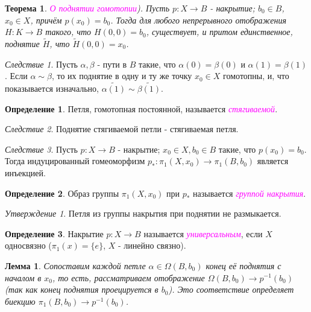 \documentclass[a4paper,100pt]{article}
\theoremstyle{indented}
\newtheorem{theorem}{Теорема}
\newtheorem{lemma}{Лемма}
\theoremstyle{definition}
\newtheorem{defn}{Определение}
\theoremstyle{remark}
\newtheorem{cons}{Следствие}
\newtheorem{stat}{Утверждение}
\DeclareMathOperator{\ra}{\rightarrow}
\begin{document}
\begin{theorem}
    \textit{\textcolor{magenta}{\hypertarget{s122}{О поднятии гомотопии}}}). Пусть $p: X \ra B$ - накрытие; $b_0 \in B$, $x_0 \in X$, причём $p(x_0)=b_0$. Тогда для любого непрерывного отображения $H: K \ra B$ такого, что $H(0, 0) = b_0$, существует, и притом единственное, поднятие $\tilde{H}$, что $\tilde{H}(0, 0) = x_0$. 
\end{theorem}

\begin{cons}
    Пусть $\alpha, \beta$ - пути в $B$ такие, что $\alpha(0) = \beta(0)$ и $\alpha(1) = \beta(1)$. Если $\alpha \sim \beta$, то их поднятие в одну и ту же точку $x_0 \in X$ гомотопны, и, что показывается изначально, $\tilde{\alpha(1)} \sim \tilde{\beta(1)}$.
\end{cons}

\begin{defn}
    Петля, гомотопная постоянной, называется \textit{\textcolor{magenta}{\hypertarget{s123}{стягиваемой}}}.
\end{defn}

\begin{cons}
    Поднятие стягиваемой петли - стягиваемая петля.
\end{cons}

\begin{cons}
    Пусть $p: X \ra B$ - накрытие; $x_0 \in X, b_0 \in B$ такие, что $p(x_0) = b_0$. Тогда индуцированный гомеоморфизм $p_*: \pi_1(X, x_0) \ra \pi_1(B, b_0)$ является инъекцией.
\end{cons}

\begin{defn}
    Образ группы $\pi_1(X, x_0)$ при $p_*$ называется \textit{\textcolor{magenta}{\hypertarget{s124}{группой накрытия}}}.
\end{defn}

\begin{stat}
    Петля из группы накрытия при поднятии не размыкается.
\end{stat}

\begin{defn}
    Накрытие $p: X \ra B$ называется \textit{\textcolor{magenta}{\hypertarget{s125}{универсальным}}}, если $X$ односвязно ($\pi_1(x) = \{e\}$, $X$ - линейно связно).
\end{defn}

\begin{lemma}
    Сопоставим каждой петле $\alpha \in \Omega(B, b_0)$ конец её поднятия с началом в $x_0$, то есть, рассматриваем отображение $\Omega(B, b_0) \ra p^{-1}(b_0)$ (так как конец поднятия проецируется в $b_0$). Это соответствие определяет биекцию $\pi_1(B, b_0) \ra p^{-1}(b_0)$.
\end{lemma} \ 
\end{document}
